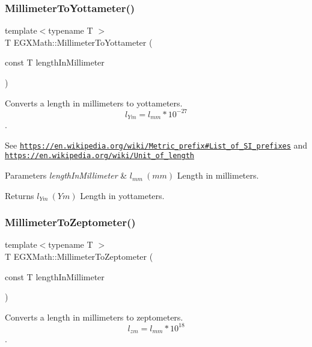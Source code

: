 \subsubsection{\texorpdfstring{Millimeter\+To\+Yottameter()}{MillimeterToYottameter()}}
{\footnotesize\ttfamily template$<$typename T $>$ \\
T E\+G\+X\+Math\+::\+Millimeter\+To\+Yottameter (\begin{DoxyParamCaption}\item[{const T}]{length\+In\+Millimeter }\end{DoxyParamCaption})}



Converts a length in millimeters to yottameters. \[ l_{Ym}=l_{mm} * 10^{-27} \]. 

See \href{https://en.wikipedia.org/wiki/Metric_prefix#List_of_SI_prefixes}{\tt https\+://en.\+wikipedia.\+org/wiki/\+Metric\+\_\+prefix\#\+List\+\_\+of\+\_\+\+S\+I\+\_\+prefixes} and \href{https://en.wikipedia.org/wiki/Unit_of_length}{\tt https\+://en.\+wikipedia.\+org/wiki/\+Unit\+\_\+of\+\_\+length} 
\begin{DoxyParams}{Parameters}
{\em length\+In\+Millimeter} & $ l_{mm}\ (mm)$ Length in millimeters. \\
\hline
\end{DoxyParams}
\begin{DoxyReturn}{Returns}
$ l_{Ym}\ (Ym)$ Length in yottameters. 
\end{DoxyReturn}
\mbox{\label{group___e_g_x_math-_conversions-_length_conversions-_millimeter-_s_i_ga7973ce559c88b84035d9653e26e4464c}} 
\subsubsection{\texorpdfstring{Millimeter\+To\+Zeptometer()}{MillimeterToZeptometer()}}
{\footnotesize\ttfamily template$<$typename T $>$ \\
T E\+G\+X\+Math\+::\+Millimeter\+To\+Zeptometer (\begin{DoxyParamCaption}\item[{const T}]{length\+In\+Millimeter }\end{DoxyParamCaption})}



Converts a length in millimeters to zeptometers. \[ l_{zm}=l_{mm} * 10^{18} \]. 

